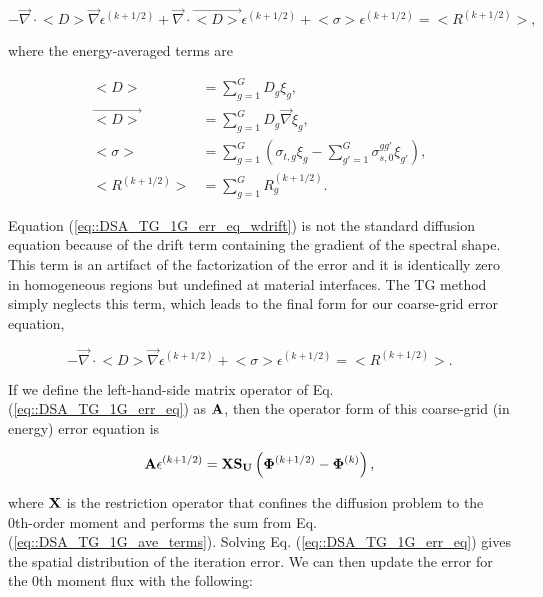\begin{equation}
\label{eq::DSA_TG_1G_err_eq_wdrift}
-\vec{\nabla} \cdot \big< D \big> \vec{\nabla} \epsilon^{(k+1/2)} + \vec{\nabla} \cdot \vec{\big< D \big>} \epsilon^{(k+1/2)} + \big< \sigma \big> \epsilon^{(k+1/2)}  = \big< R^{(k+1/2)} \big> ,
\end{equation}

\noindent where the energy-averaged terms are 

\begin{equation}
\label{eq::DSA_TG_1G_ave_terms}
\begin{aligned}
\big< D \big> &= \sum_{g=1}^G D_g \xi_g, \\
\vec{\big< D \big>} &= \sum_{g=1}^G D_g \vec{\nabla} \xi_g ,\\
\big< \sigma \big> &= \sum_{g=1}^G \left( \sigma_{t,g} \xi_g -  \sum_{g'=1}^G \sigma_{s,0}^{g g'}  \xi_{g'} \right), \\
\big< R^{(k+1/2)} \big> &= \sum_{g=1}^G R_g^{(k+1/2)}.
\end{aligned}
\end{equation}

\noindent Equation (\ref{eq::DSA_TG_1G_err_eq_wdrift}) is not the standard diffusion equation because of the drift term containing the gradient of the spectral shape. This term is an artifact of the factorization of the error and it is identically zero in homogeneous regions but undefined at material interfaces. The TG method simply neglects this term, which leads to the final form for our coarse-grid error equation,

\begin{equation}
\label{eq::DSA_TG_1G_err_eq}
-\vec{\nabla} \cdot \big< D \big> \vec{\nabla} \epsilon^{(k+1/2)}  + \big< \sigma \big> \epsilon^{(k+1/2)}  = \big< R^{(k+1/2)} \big> .
\end{equation}

\noindent If we define the left-hand-side matrix operator of Eq. (\ref{eq::DSA_TG_1G_err_eq}) as ${\bf A}$, then the operator form of this coarse-grid (in energy) error equation is 

\begin{equation}
\label{eq::DSA_TG_1G_err_eq_op}
{\bf A} \epsilon^{(k+1/2)}  =  {\bf X} {\bf S_{U}} \left(  {\bf \Phi}^{(k+1/2)} - {\bf \Phi}^{(k)}  \right),
\end{equation}

\noindent where ${\bf X}$ is the restriction operator that confines the diffusion problem to the 0th-order moment and performs the sum from Eq. (\ref{eq::DSA_TG_1G_ave_terms}). Solving Eq. (\ref{eq::DSA_TG_1G_err_eq}) gives the spatial distribution of the iteration error. We can then update the error for the 0th moment flux with the following:


